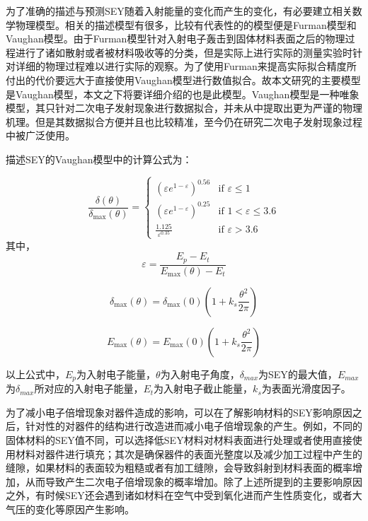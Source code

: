 \documentclass[master]{thesis-uestc}
\begin{document}
为了准确的描述与预测SEY随着入射能量的变化而产生的变化，有必要建立相关数学物理模型。相关的描述模型有很多，比较有代表性的的模型便是Furman模型和Vaughan模型。由于Furman模型针对入射电子轰击到固体材料表面之后的物理过程进行了诸如散射或者被材料吸收等的分类，但是实际上进行实际的测量实验时针对详细的物理过程难以进行实际的观察。为了使用Furman来提高实际拟合精度所付出的代价要远大于直接使用Vaughan模型进行数值拟合。故本文研究的主要模型是Vaughan模型，本文之下将要详细介绍的也是此模型。Vaughan模型是一种唯象模型，其只针对二次电子发射现象进行数据拟合，并未从中提取出更为严谨的物理机理。但是其数据拟合方便并且也比较精准，至今仍在研究二次电子发射现象过程中被广泛使用。

描述SEY的Vaughan模型中的计算公式为：

\begin{equation}\label{eq:SEY_Vaughan}
    \frac{\delta(\theta)}{\delta_{\max}(\theta)} = 
    \begin{cases} 
    \left( \varepsilon e^{1 - \varepsilon} \right)^{0.56} & \text{if } \varepsilon \leq 1 \\
    \left( \varepsilon e^{1 - \varepsilon} \right)^{0.25} & \text{if } 1 < \varepsilon \leq 3.6 \\
    \frac{1.125}{\varepsilon^{0.35}} & \text{if } \varepsilon > 3.6
    \end{cases}
\end{equation}
其中，
$$
\varepsilon = \frac{E_p - E_t}{E_{\max}(\theta) - E_t}
$$

$$
\delta_{\max}(\theta) = \delta_{\max}(0) \left( 1 + k_s \frac{\theta^2}{2\pi} \right)
$$

$$
E_{\max}(\theta) = E_{\max}(0) \left( 1 + k_s \frac{\theta^2}{2\pi} \right)
$$

以上公式中，$E_p$为入射电子能量，$\theta$为入射电子角度，$\delta_{max}$为SEY的最大值，$E_{max}$为$\delta_{max}$所对应的入射电子能量，$E_t$为入射电子截止能量，$k_s$为表面光滑度因子。

为了减小电子倍增现象对器件造成的影响，可以在了解影响材料的SEY影响原因之后，针对性的对器件的结构进行改造进而减小电子倍增现象的产生。例如，不同的固体材料的SEY值不同，可以选择低SEY材料对材料表面进行处理或者使用直接使用材料对器件进行填充；其次是确保器件的表面光整度以及减少加工过程中产生的缝隙，如果材料的表面较为粗糙或者有加工缝隙，会导致斜射到材料表面的概率增加，从而导致产生二次电子倍增现象的概率增加。除了上述所提到的主要影响原因之外，有时候SEY还会遇到诸如材料在空气中受到氧化进而产生性质变化，或者大气压的变化等原因产生影响。
\end{document}
